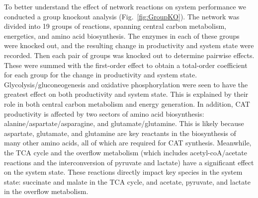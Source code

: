 \documentclass[12pt]{article}
\begin{document}
To better understand the effect of network reactions on system performance we conducted a group knockout analysis (Fig.~\ref{fig:GroupKO}).
The network was divided into 19 groups of reactions, spanning central carbon metabolism, energetics, and amino acid biosynthesis.
The enzymes in each of these groups were knocked out, and the resulting change in productivity and system state were recorded.
Then each pair of groups was knocked out to determine pairwise effects.
These were summed with the first-order effect to obtain a total-order coefficient for each group for the change in productivity and system state.
Glycolysis\slash gluconeogenesis and oxidative phosphorylation were seen to have the greatest effect on both productivity and system state.
This is explained by their role in both central carbon metabolism and energy generation.
In addition, CAT productivity is affected by two sectors of amino acid biosynthesis: alanine\slash aspartate\slash asparagine, and glutamate\slash glutamine.
This is likely because aspartate, glutamate, and glutamine are key reactants in the biosynthesis of many other amino acids, all of which are required for CAT synthesis.
Meanwhile, the TCA cycle and the overflow metabolism (which includes acetyl-coA\slash acetate reactions and the interconversion of pyruvate and lactate) have a significant effect on the system state.
These reactions directly impact key species in the system state: succinate and malate in the TCA cycle, and acetate, pyruvate, and lactate in the overflow metabolism.
\end{document}
